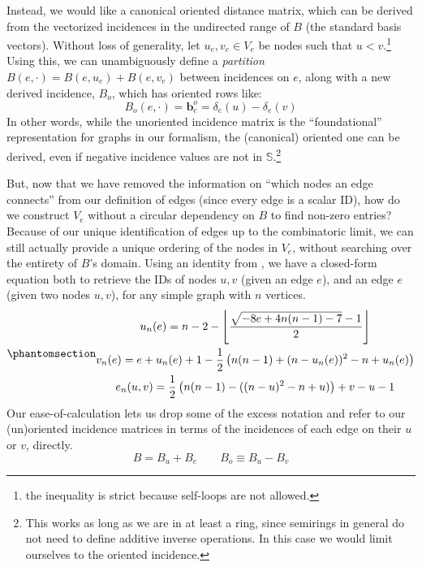 \documentclass[%
	12pt,
		oneside,
		letterpaper
]{book}
\begin{document}
Instead, we would like a canonical oriented distance matrix, which can
be derived from the vectorized incidences in the undirected range of
\(B\) (the standard basis vectors). Without loss of generality, let
\(u_e,v_e\in V_e\) be nodes such that \(u<v\).\footnote{the inequality
  is strict because self-loops are not allowed.} Using this, we can
unambiguously define a \emph{partition}
\(B(e,\cdot)=B(e,u_e) + B(e,v_e)\) between incidences on \(e\), along
with a new derived incidence, \(B_o\), which has oriented rows like:
\[B_o(e,\cdot)=\mathbf{b}^o_e = \delta_e(u)-\delta_e(v)\] In other
words, while the unoriented incidence matrix is the ``foundational''
representation for graphs in our formalism, the (canonical) oriented one
can be derived, even if negative incidence values are not in
\(\mathbb{S}\).\footnote{ This works as long as we are in at least a
  ring, since semirings in general do not need to define additive
  inverse operations. In this case we would limit ourselves to the
  oriented incidence.}

But, now that we have removed the information on ``which nodes an edge
connects'' from our definition of edges (since every edge is a scalar
ID), how do we construct \(V_e\) without a circular dependency on \(B\)
to find non-zero entries? Because of our unique identification of edges
up to the combinatoric limit, we can still actually provide a unique
ordering of the nodes in \(V_e\), without searching over the entirety of
\(B\)'s domain. Using an identity from
\textcite{ParallelEuclideandistance_Angeletti2019}, we have a
closed-form equation both to retrieve the IDs of nodes \(u,v\) (given an
edge \(e\)), and an edge \(e\) (given two nodes \(u,v\)), for any simple
graph with \(n\) vertices.
\begin{equation}\phantomsection\label{eq-sq-id}{
\begin{gathered}
    u_n(e) = n - 2 - \left\lfloor\frac{\sqrt{-8e + 4n(n - 1) - 7}-1}{2}\right\rfloor\\
    v_n(e) = e + u_n(e) + 1 -\frac{1}{2} \left(n (n - 1) + (n - u_n(e))^2 - n+u_n(e)\right)\\
    e_n(u,v) = \frac{1}{2}\left(n(n - 1) - ((n - u)^2 - n+u)\right) + v - u - 1
\end{gathered}
}\end{equation} Our ease-of-calculation lets us drop some of the excess
notation and refer to our (un)oriented incidence matrices in terms of
the incidences of each edge on their \(u\) or \(v\), directly. \[
B = B_u + B_e \qquad B_o \equiv B_u - B_v
\]
\end{document}
